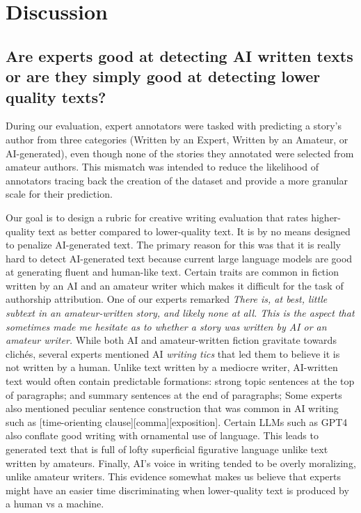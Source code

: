 \section{Discussion}

\subsection{Are experts good at detecting AI written texts or are they simply good at detecting lower quality texts?}
During our evaluation, expert annotators were tasked with predicting a story's author from three categories (Written by an Expert, Written by an Amateur, or AI-generated), even though none of the stories they annotated were selected from amateur authors. This mismatch was intended to reduce the likelihood of annotators tracing back the creation of the dataset and provide a more granular scale for their prediction.

Our goal is to design a rubric for creative writing evaluation that rates higher-quality text as better compared to lower-quality text. It is by no means designed to penalize AI-generated text. The primary reason for this was that it is really hard to detect AI-generated text because current large language models are good at generating fluent and human-like text. Certain traits are common in fiction written by an AI and an amateur writer which makes it difficult for the task of authorship attribution. One of our experts remarked \textit{There is, at best, little subtext in an amateur-written story, and likely none at all. This is the aspect that sometimes made me hesitate as to whether a story was written by AI or an amateur writer.} While both AI and amateur-written fiction gravitate towards clichés, several experts mentioned AI \textit{writing tics} that led them to believe it is not written by a human. Unlike text written by a mediocre writer, AI-written text would often contain predictable formations: strong topic sentences at the top of paragraphs; and summary sentences at the end of paragraphs; Some experts also mentioned peculiar sentence construction that was common in AI writing such as [time-orienting clause][comma][exposition]. Certain LLMs such as GPT4 also conflate good writing with ornamental use of language. This leads to generated text that is full of lofty superficial figurative language unlike text written by amateurs. Finally, AI's voice in writing tended to be overly moralizing, unlike amateur writers. This evidence somewhat makes us believe that experts might have an easier time discriminating when lower-quality text is produced by a human vs a machine.


